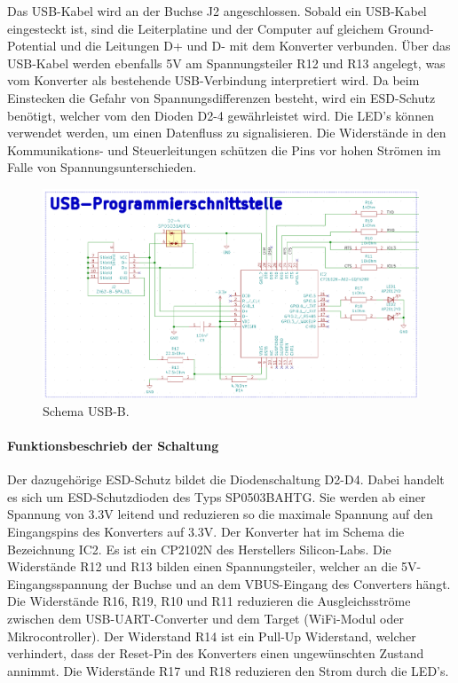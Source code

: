 Das USB-Kabel wird an der Buchse J2 angeschlossen. Sobald ein USB-Kabel eingesteckt ist, sind die Leiterplatine und der Computer auf gleichem Ground-Potential und die Leitungen D+ und D- mit dem Konverter verbunden. Über das USB-Kabel werden ebenfalls 5V am Spannungsteiler R12 und R13 angelegt, was vom Konverter als bestehende USB-Verbindung interpretiert wird. Da beim Einstecken die Gefahr von Spannungsdifferenzen besteht, wird ein ESD-Schutz benötigt, welcher vom den Dioden D2-4 gewährleistet wird. Die LED's können verwendet werden, um einen Datenfluss zu signalisieren. Die Widerstände in den Kommunikations- und Steuerleitungen schützen die Pins vor hohen Strömen im Falle von Spannungsunterschieden.
\begin{figure}[h!]
	\centering
	\includegraphics[width=1\textwidth]{graphics/Schema_USB_B}
	\caption{Schema USB-B.}
	\label{fig:Schema_USB_B}
\end{figure}
\newpage
\paragraph{Funktionsbeschrieb der Schaltung}\mbox{}

Der dazugehörige ESD-Schutz bildet die Diodenschaltung D2-D4. Dabei handelt es sich um ESD-Schutzdioden des Typs SP0503BAHTG. Sie werden ab einer Spannung von 3.3V leitend und reduzieren so die maximale Spannung auf den Eingangspins des Konverters auf 3.3V. Der Konverter hat im Schema die Bezeichnung IC2. Es ist ein CP2102N des Herstellers Silicon-Labs. Die Widerstände R12 und R13 bilden einen Spannungsteiler, welcher an die 5V-Eingangsspannung der Buchse und an dem VBUS-Eingang des Converters hängt. Die Widerstände R16, R19, R10 und R11 reduzieren die Ausgleichsströme zwischen dem USB-UART-Converter und dem Target (WiFi-Modul oder Mikrocontroller). Der Widerstand R14 ist ein Pull-Up Widerstand, welcher verhindert, dass der Reset-Pin des Konverters einen ungewünschten Zustand annimmt. Die Widerstände R17 und R18 reduzieren den Strom durch die LED's.